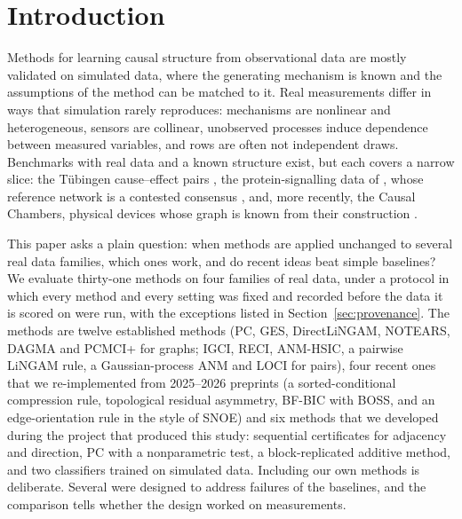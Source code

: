
\section{Introduction}\label{sec:intro}

Methods for learning causal structure from observational data are mostly validated on
simulated data, where the generating mechanism is known and the assumptions of the method
can be matched to it. Real measurements differ in ways that simulation rarely reproduces:
mechanisms are nonlinear and heterogeneous, sensors are collinear, unobserved processes
induce dependence between measured variables, and rows are often not independent draws.
Benchmarks with real data and a known structure exist, but each covers a narrow slice:
the Tübingen cause--effect pairs \citep{mooij2016distinguishing}, the protein-signalling
data of \citet{sachs2005causal}, whose reference network is a contested consensus
\citep{mooij2020joint}, and, more recently, the Causal Chambers, physical devices whose
graph is known from their construction \citep{gamella2025chamber}.

This paper asks a plain question: when methods are applied unchanged to several real
data families, which ones work, and do recent ideas beat simple baselines? We evaluate
thirty-one methods on four families of real data, under a protocol in which every method and
every setting was fixed and recorded before the data it is scored on were run, with the
exceptions listed in Section~\ref{sec:provenance}. The methods are twelve established
methods (PC, GES, DirectLiNGAM, NOTEARS, DAGMA and PCMCI+ for graphs; IGCI, RECI, ANM-HSIC, a
pairwise LiNGAM rule, a Gaussian-process ANM and LOCI for pairs), four recent ones that we re-implemented from 2025--2026 preprints (a
sorted-conditional compression rule, topological residual asymmetry, BF-BIC with BOSS, and an
edge-orientation rule in the style of SNOE) and six methods that we developed during the project that produced
this study: sequential certificates for adjacency and direction, PC with a nonparametric
test, a block-replicated additive method, and two classifiers trained on simulated data.
Including our own methods is deliberate. Several were designed to address failures of the
baselines, and the comparison tells whether the design worked on measurements.

